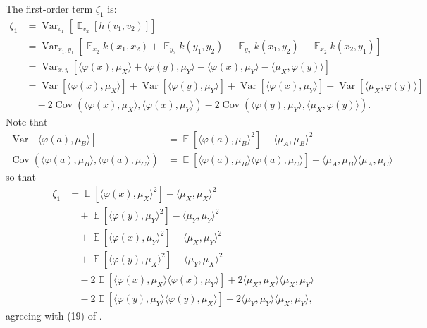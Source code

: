 \documentclass{article}
\DeclareMathOperator{\E}{\mathbb{E}}
\DeclareMathOperator{\Var}{Var}
\DeclareMathOperator{\Cov}{Cov}
\begin{document}
The first-order term $\zeta_1$ is:
    \begin{align*}
\zeta_1
&=  \Var_{v_1}\left[ \E_{v_2}\left[ h(v_1, v_2) \right] \right]
\\&= \Var_{x_1, y_1}\left[
      \E_{x_2} k(x_1, x_2)
    + \E_{y_2} k(y_1, y_2)
    - \E_{y_2} k(x_1, y_2)
    - \E_{x_2} k(x_2, y_1)
\right]
\\&= \Var_{x, y}\left[
    \langle \varphi(x), \mu_X \rangle
    + \langle \varphi(y), \mu_Y \rangle
    - \langle \varphi(x), \mu_Y \rangle
    - \langle \mu_X, \varphi(y) \rangle
\right]
\\&= \Var\left[ \langle \varphi(x), \mu_X \rangle \right]
   + \Var\left[ \langle \varphi(y), \mu_Y \rangle \right]
   + \Var\left[ \langle \varphi(x), \mu_Y \rangle \right]
   + \Var\left[ \langle \mu_X, \varphi(y) \rangle \right]
\\&\quad
   - 2 \Cov\left( \langle \varphi(x), \mu_X \rangle, \langle \varphi(x), \mu_Y \rangle \right)
   - 2 \Cov\left( \langle \varphi(y), \mu_Y \rangle, \langle \mu_X, \varphi(y) \rangle \right)
.\end{align*}
Note that
\begin{align*}
     \Var\left[ \langle \varphi(a), \mu_B \rangle \right]
  &= \E\left[ \langle \varphi(a), \mu_B \rangle^2 \right] - \langle \mu_A, \mu_B \rangle^2
\\   \Cov\left( \langle \varphi(a), \mu_B \rangle, \langle \varphi(a), \mu_C \rangle \right)
  &= \E\left[ \langle \varphi(a), \mu_B \rangle \langle \varphi(a), \mu_C \rangle \right]
   - \langle \mu_A, \mu_B \rangle \langle \mu_A, \mu_C \rangle
\end{align*}
so that
\begin{align*}
\zeta_1
&= \E\left[ \langle \varphi(x), \mu_X \rangle^2 \right] - \langle \mu_X, \mu_X \rangle^2
\\&\quad
 + \E\left[ \langle \varphi(y), \mu_Y \rangle^2 \right] - \langle \mu_Y, \mu_Y \rangle^2
\\&\quad
 + \E\left[ \langle \varphi(x), \mu_Y \rangle^2 \right] - \langle \mu_X, \mu_Y \rangle^2
\\&\quad
 + \E\left[ \langle \varphi(y), \mu_X \rangle^2 \right] - \langle \mu_Y, \mu_X \rangle^2
\\&\quad
 - 2 \E\left[ \langle \varphi(x), \mu_X \rangle \langle \varphi(x), \mu_Y \rangle \right]
 + 2 \langle \mu_X, \mu_X \rangle \langle \mu_X, \mu_Y \rangle
\\&\quad
 - 2 \E\left[ \langle \varphi(y), \mu_Y \rangle \langle \varphi(y), \mu_X \rangle \right]
 + 2 \langle \mu_Y, \mu_Y \rangle \langle \mu_X, \mu_Y \rangle
,\end{align*}
agreeing with (19) of \textcite{three-sample}.
\end{document}
